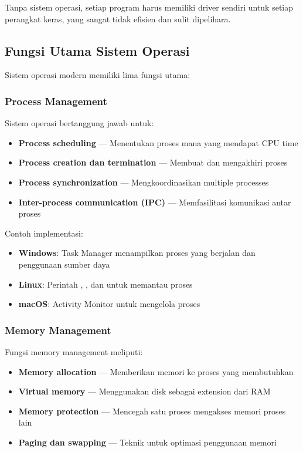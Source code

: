 \begin{notebox}
Tanpa sistem operasi, setiap program harus memiliki driver sendiri untuk setiap perangkat keras, yang sangat tidak efisien dan sulit dipelihara.
\end{notebox}

\subsection{Fungsi Utama Sistem Operasi}

Sistem operasi modern memiliki lima fungsi utama:

\subsubsection{Process Management}

Sistem operasi bertanggung jawab untuk:
\begin{itemize}
    \item \textbf{Process scheduling} --- Menentukan proses mana yang mendapat CPU time
    \item \textbf{Process creation dan termination} --- Membuat dan mengakhiri proses
    \item \textbf{Process synchronization} --- Mengkoordinasikan multiple processes
    \item \textbf{Inter-process communication (IPC)} --- Memfasilitasi komunikasi antar proses
\end{itemize}

Contoh implementasi:
\begin{itemize}
    \item \textbf{Windows}: Task Manager menampilkan proses yang berjalan dan penggunaan sumber daya
    \item \textbf{Linux}: Perintah , , dan  untuk memantau proses
    \item \textbf{macOS}: Activity Monitor untuk mengelola proses
\end{itemize}

\subsubsection{Memory Management}

Fungsi memory management meliputi:
\begin{itemize}
    \item \textbf{Memory allocation} --- Memberikan memori ke proses yang membutuhkan
    \item \textbf{Virtual memory} --- Menggunakan disk sebagai extension dari RAM
    \item \textbf{Memory protection} --- Mencegah satu proses mengakses memori proses lain
    \item \textbf{Paging dan swapping} --- Teknik untuk optimasi penggunaan memori
\end{itemize}

